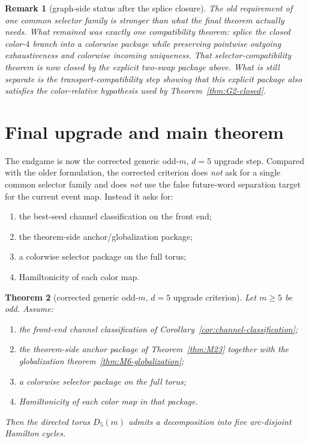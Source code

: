 \documentclass[11pt]{article}
\newtheorem{theorem}{Theorem}[section]
\newtheorem{remark}[theorem]{Remark}
\begin{document}
\begin{remark}[graph-side status after the splice closure]
The old requirement of one common selector family is stronger than what the
final theorem actually needs.
What remained was exactly one compatibility theorem: splice the closed color-$4$
branch into a colorwise package while preserving pointwise outgoing
exhaustiveness and colorwise incoming uniqueness.
That selector-compatibility theorem is now closed by the explicit two-swap
package above.
What is still separate is the transport-compatibility step showing that this
explicit package also satisfies the color-relative hypothesis used by
Theorem~\ref{thm:G2-closed}.
\end{remark}

\section{Final upgrade and main theorem}

The endgame is now the corrected generic odd-$m$, $d=5$ upgrade step.
Compared with the older formulation, the corrected criterion does \emph{not}
ask for a single common selector family and does \emph{not} use the false
future-word separation target for the current event map.
Instead it asks for:
\begin{enumerate}[label=\textup{(\arabic*)},leftmargin=2.8em]
\item the best-seed channel classification on the front end;
\item the theorem-side anchor/globalization package;
\item a colorwise selector package on the full torus;
\item Hamiltonicity of each color map.
\end{enumerate}

\begin{theorem}[corrected generic odd-$m$, $d=5$ upgrade criterion]
\label{thm:generic-upgrade}
Let $m\ge 5$ be odd.
Assume:
\begin{enumerate}[label=\textup{(G\arabic*)},leftmargin=3.0em]
\item the front-end channel classification of
      Corollary~\ref{cor:channel-classification};
\item the theorem-side anchor package of Theorem~\ref{thm:M23} together with
      the globalization theorem~\ref{thm:M6-globalization};
\item a colorwise selector package on the full torus;
\item Hamiltonicity of each color map in that package.
\end{enumerate}
Then the directed torus $D_5(m)$ admits a decomposition into five arc-disjoint
Hamilton cycles.
\end{theorem}
\end{document}
